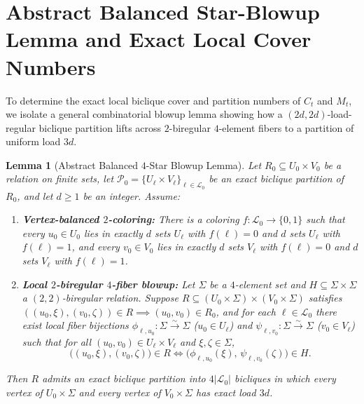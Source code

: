 \documentclass[11pt,reqno]{amsart}
\newtheorem{lemma}[theorem]{Lemma}
\theoremstyle{definition}
\theoremstyle{remark}
\numberwithin{equation}{section}
\begin{document}
\section{Abstract Balanced Star-Blowup Lemma and Exact Local Cover Numbers}
\label{sec:local}

To determine the exact local biclique cover and partition numbers of $C_t$ and $M_t$, we isolate a general combinatorial blowup lemma showing how a $(2d, 2d)$-load-regular biclique partition lifts across $2$-biregular $4$-element fibers to a partition of uniform load $3d$.

\begin{lemma}[Abstract Balanced $4$-Star Blowup Lemma]
  \label{lem:abstract-star-blowup}
  Let $R_0 \subseteq U_0 \times V_0$ be a relation on finite sets, let $\mathcal{P}_0 = \{U_\ell \times V_\ell\}_{\ell \in \mathcal{L}_0}$ be an exact biclique partition of $R_0$, and let $d \ge 1$ be an integer. Assume:
  \begin{enumerate}[leftmargin=2em,label=\textup{(\roman*)}]
    \item \textbf{Vertex-balanced $2$-coloring:} There is a coloring $f : \mathcal{L}_0 \to \{0, 1\}$ such that every $u_0 \in U_0$ lies in exactly $d$ sets $U_\ell$ with $f(\ell) = 0$ and $d$ sets $U_\ell$ with $f(\ell) = 1$, and every $v_0 \in V_0$ lies in exactly $d$ sets $V_\ell$ with $f(\ell) = 0$ and $d$ sets $V_\ell$ with $f(\ell) = 1$.
    \item \textbf{Local $2$-biregular $4$-fiber blowup:} Let $\Sigma$ be a $4$-element set and $H \subseteq \Sigma \times \Sigma$ a $(2, 2)$-biregular relation. Suppose $R \subseteq (U_0 \times \Sigma) \times (V_0 \times \Sigma)$ satisfies $((u_0, \xi), (v_0, \zeta)) \in R \implies (u_0, v_0) \in R_0$, and for each $\ell \in \mathcal{L}_0$ there exist local fiber bijections $\phi_{\ell, u_0} : \Sigma \xrightarrow{\sim} \Sigma$ ($u_0 \in U_\ell$) and $\psi_{\ell, v_0} : \Sigma \xrightarrow{\sim} \Sigma$ ($v_0 \in V_\ell$) such that for all $(u_0, v_0) \in U_\ell \times V_\ell$ and $\xi, \zeta \in \Sigma$,
    \[
      \bigl((u_0, \xi), (v_0, \zeta)\bigr) \in R \iff \bigl(\phi_{\ell, u_0}(\xi),\, \psi_{\ell, v_0}(\zeta)\bigr) \in H.
    \]
  \end{enumerate}
  Then $R$ admits an exact biclique partition into $4|\mathcal{L}_0|$ bicliques in which every vertex of $U_0 \times \Sigma$ and every vertex of $V_0 \times \Sigma$ has exact load $3d$.
\end{lemma}
\end{document}

